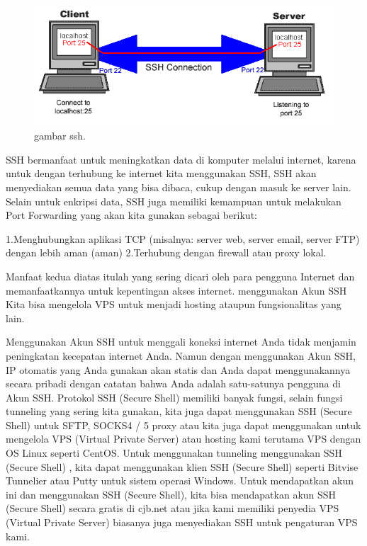 \begin{figure}[ht]
\centerline{\includegraphics[width=1\textwidth]{figures/ssh.gif}}
\caption{gambar ssh.}
\label{ssh}
\end{figure}


SSH bermanfaat untuk meningkatkan data di komputer melalui internet, karena untuk dengan terhubung ke internet kita menggunakan SSH, SSH akan menyediakan semua data yang bisa dibaca, cukup dengan masuk ke server lain.
Selain untuk enkripsi data, SSH juga memiliki kemampuan untuk melakukan Port Forwarding yang akan kita gunakan sebagai berikut:

1.Menghubungkan aplikasi TCP (misalnya: server web, server email, server FTP) dengan lebih aman (aman)
2.Terhubung dengan firewall atau proxy lokal.

Manfaat kedua diatas itulah yang sering dicari oleh para pengguna Internet dan memanfaatkannya untuk kepentingan akses internet. menggunakan Akun SSH Kita bisa mengelola VPS untuk menjadi hosting ataupun fungsionalitas yang lain.

Menggunakan Akun SSH untuk menggali koneksi internet Anda tidak menjamin peningkatan kecepatan internet Anda. Namun dengan menggunakan Akun SSH, IP otomatis yang Anda gunakan akan statis dan Anda dapat menggunakannya secara pribadi dengan catatan bahwa Anda adalah satu-satunya pengguna di Akun SSH.
Protokol SSH (Secure Shell) memiliki banyak fungsi, selain fungsi tunneling yang sering kita gunakan, kita juga dapat menggunakan SSH (Secure Shell) untuk SFTP, SOCKS4 / 5 proxy atau kita juga dapat menggunakan untuk mengelola VPS (Virtual Private Server) atau hosting kami terutama VPS dengan OS Linux seperti CentOS. Untuk menggunakan tunneling menggunakan SSH (Secure Shell) , kita dapat menggunakan klien SSH (Secure Shell) seperti Bitvise Tunnelier atau Putty untuk sistem operasi Windows.
Untuk mendapatkan akun ini dan menggunakan SSH (Secure Shell), kita bisa mendapatkan akun SSH (Secure Shell) secara gratis di cjb.net atau jika kami memiliki penyedia VPS (Virtual Private Server) biasanya juga menyediakan SSH untuk pengaturan VPS kami.

